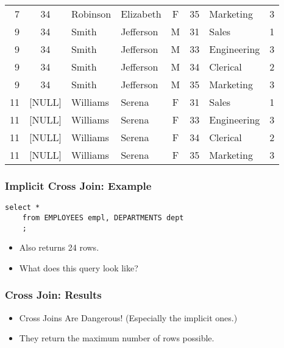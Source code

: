 \documentclass{beamer}
\begin{document}
\begin{frame}
\begin{center}
{\begin{tabulary}{\textwidth}{RCLLCRLC}
        7   & 34       & Robinson   & Elizabeth   & F      & 35       & Marketing   & 3           \\
        9   & 34       & Smith      & Jefferson   & M      & 31       & Sales       & 1           \\
        9   & 34       & Smith      & Jefferson   & M      & 33       & Engineering & 3           \\
        9   & 34       & Smith      & Jefferson   & M      & 34       & Clerical    & 2           \\
        9   & 34       & Smith      & Jefferson   & M      & 35       & Marketing   & 3           \\
        11  & [NULL]   & Williams   & Serena      & F      & 31       & Sales       & 1           \\
        11  & [NULL]   & Williams   & Serena      & F      & 33       & Engineering & 3           \\
        11  & [NULL]   & Williams   & Serena      & F      & 34       & Clerical    & 2           \\
        11  & [NULL]   & Williams   & Serena      & F      & 35       & Marketing   & 3           \\
      \end{tabulary}
    }
  \end{center}

\end{frame}

\begin{frame}[containsverbatim] %
  \frametitle{Implicit Cross Join: Example}
 
  \begin{lstlisting}[title={\tiny Source: https://github.com/Choens/sql-survival-guide/blob/master/sql/04-joins/cross-joins.sql}]
    select *
    from EMPLOYEES empl, DEPARTMENTS dept
    ;
  \end{lstlisting}
  \bigskip
  \begin{itemize}
  \item Also returns 24 rows.
  \item What does this query look like?
  \end{itemize}
  
\end{frame}

\begin{frame} %
  \frametitle{Cross Join: Results}
  \begin{itemize}
  \item Cross Joins Are Dangerous! (Especially the implicit ones.)
  \item They return the maximum number of rows possible.
  \end{itemize}
\end{frame}
\end{document}
